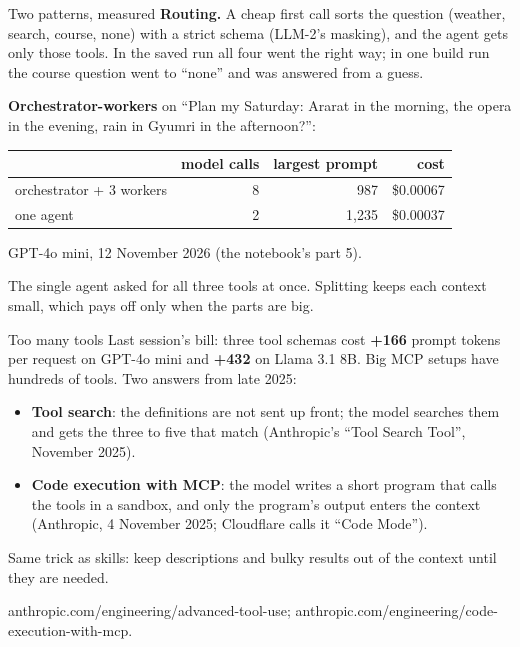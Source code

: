 \documentclass[aspectratio=169]{beamer}
\newcommand{\keybox}[1]{%
  \begin{tcolorbox}[colback=armblue!8, colframe=armblue, boxrule=0.6pt, arc=2pt]
  #1
  \end{tcolorbox}}
\newcommand{\takebox}[1]{%
  \begin{tcolorbox}[colback=paramgreen!8, colframe=paramgreen, boxrule=0.6pt, arc=2pt]
  #1
  \end{tcolorbox}}
\newcommand{\src}[1]{{\scriptsize\color{gray} #1}}
\begin{document}
\begin{frame}{Two patterns, measured}
  \vspace{0.3em}
  \textbf{Routing.} A cheap first call sorts the question (weather, search, course, none) with a strict schema
  (LLM-2's masking), and the agent gets only those tools. In the saved run all four went the right way; in one
  build run the course question went to ``none'' and was answered from a guess.

  \vspace{0.5em}
  \textbf{Orchestrator-workers} on ``Plan my Saturday: Ararat in the morning, the opera in the evening, rain in
  Gyumri in the afternoon?'':

  \vspace{0.2em}
  \begin{center}
  \small
  \begin{tabular}{lrrr}
    \toprule
    & \textbf{model calls} & \textbf{largest prompt} & \textbf{cost} \\
    \midrule
    orchestrator + 3 workers & 8 & 987 & \$0.00067 \\
    one agent & 2 & 1,235 & \$0.00037 \\
    \bottomrule
  \end{tabular}
  \end{center}
  \src{GPT-4o mini, 12 November 2026 (the notebook's part 5).}

  \vspace{0.2em}
  \takebox{\small The single agent asked for all three tools at once. Splitting keeps each context small, which pays
  off only when the parts are big.}
\end{frame}

\begin{frame}{Too many tools}
  \vspace{0.4em}
  Last session's bill: three tool schemas cost \textbf{+166} prompt tokens per request on GPT-4o mini and
  \textbf{+432} on Llama 3.1 8B. Big MCP setups have hundreds of tools. Two answers from late 2025:

  \vspace{0.4em}
  \begin{itemize}
    \item \textbf{Tool search}: the definitions are not sent up front; the model searches them and gets the three
      to five that match (Anthropic's ``Tool Search Tool'', November 2025).
    \item \textbf{Code execution with MCP}: the model writes a short program that calls the tools in a sandbox,
      and only the program's output enters the context (Anthropic, 4 November 2025; Cloudflare calls it ``Code
      Mode'').
  \end{itemize}

  \vspace{0.4em}
  \keybox{\small Same trick as skills: keep descriptions and bulky results out of the context until they are
  needed.}
  \src{anthropic.com/engineering/advanced-tool-use; anthropic.com/engineering/code-execution-with-mcp.}
\end{frame}
\end{document}
